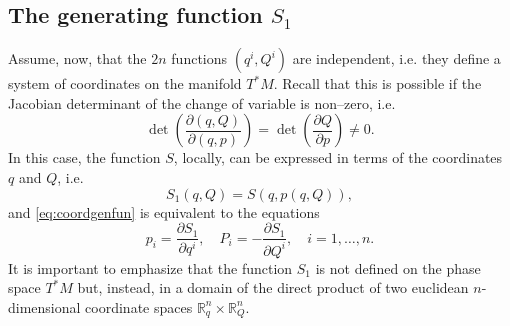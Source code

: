 \documentclass[english,fontsize=11pt,paper=a5,oneside]{scrbook}
\newcommand{\R}{\mathbb{R}}
\theoremstyle{definition}
\begin{document}
\subsection{The generating function $S_1$}

Assume, now, that the $2n$ functions $(q^i, Q^i)$ are independent, i.e. they define a system of coordinates on the manifold $T^*M$. Recall that this is possible if the Jacobian determinant of the change of variable is non--zero, i.e.
\begin{equation}
    \det\left(\frac{\partial(q,Q)}{\partial(q,p)}\right) = \det\left(\frac{\partial Q}{\partial p} \right)\neq 0.
\end{equation}
In this case, the function $S$, locally, can be expressed in terms of the coordinates $q$ and $Q$, i.e.
\begin{equation}
    S_1(q, Q) = S(q, p(q,Q)),
\end{equation}
and \eqref{eq:coordgenfun} is equivalent to the equations
\begin{equation}\label{eq:coordgenfun1}
    p_i = \frac{\partial S_1}{\partial q^i}, \quad
    P_i = -\frac{\partial S_1}{\partial Q^i}, \quad
    i = 1,\ldots,n.
\end{equation}
It is important to emphasize that the function $S_1$ is not defined on the phase space $T^*M$ but, instead, in a domain of the direct product of two euclidean $n$-dimensional coordinate spaces $\R^n_q\times \R^n_Q$.
\end{document}
